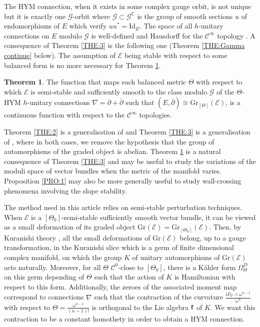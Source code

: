 \documentclass{article}
\theoremstyle{remark}
\theoremstyle{definition}
\newtheorem{theoremIntro}{Theorem}
\newcommand{\C}{\mathbb{C}}
\newcommand{\Id}{\mathrm{Id}}
\renewcommand{\i}{\boldsymbol{\mathrm{i}}}
\newcommand{\E}{\mathcal{E}}
\newcommand{\G}{\mathcal{G}}
\newcommand{\Gr}{\mathrm{Gr}}
\newcommand{\dbar}{\overline{\partial}}
\newcommand{\mC}{\mathcal{C}}
\begin{document}
The HYM connection, when it exists in some complex gauge orbit, is not unique but it is exactly one $\G$-orbit where $\G \subset \G^\C$ is the group of smooth sections $u$ of endomorphisms of $E$ which verify $uu^* = \Id_E$. The space of all $h$-unitary connections on $E$ modulo $\G$ is well-defined and Hausdorff for the $\mC^\infty$ topology \cite[Corollary 7.1.15]{Kobayashi}. A consequence of Theorem \ref{THE:3} is the following one (Theorem \ref{THE:Gamma continue} below). The assumption of $\E$ being stable with respect to some balanced form is no more necessary for Theorem \ref{THE:4}.

\begin{theoremIntro}\label{THE:4}
    The function that maps each balanced metric $\Theta$ with respect to which $\E$ is semi-stable and sufficiently smooth to the class modulo $\G$ of the $\Theta$-HYM $h$-unitary connections $\nabla = \partial + \dbar$ such that $(E,\dbar) \cong \Gr_{[\Theta]}(\E)$, is a continuous function with respect to the $\mC^\infty$ topologies.
\end{theoremIntro}

Theorem \ref{THE:2} is a generalisation of \cite[Proposition 1.1]{Clarke_Tipler} and Theorem \ref{THE:3} is a generalisation of \cite[Theorem 1.2]{Clarke_Tipler}, where in both cases, we remove the hypothesis that the group of automorphisms of the graded object is abelian. Theorem \ref{THE:4} is a natural consequence of Theorem \ref{THE:3} and may be useful to study the variations of the moduli space of vector bundles when the metric of the manifold varies. Proposition \ref{PRO:1} may also be more generally useful to study wall-crossing phenomena involving the slope stability.

The method used in this article relies on semi-stable perturbation techniques. When $\E$ is a $[\Theta_0]$-semi-stable sufficiently smooth vector bundle, it can be viewed as a small deformation of its graded object $\Gr(\E) = \Gr_{[\Theta_0]}(\E)$. Then, by Kuranishi theory \cite{Kuranishi}, all the small deformations of $\Gr(\E)$ belong, up to a gauge transformation, in the Kuranishi slice which is a germ of finite dimensional complex manifold, on which the group $K$ of unitary automorphisms of $\Gr(\E)$ acts naturally. Moreover, for all $\Theta$ $\mC^0$-close to $[\Theta_0]$, there is a Kähler form $\Omega_\Theta^D$ on this germ depending of $\Theta$ such that the action of $K$ is Hamiltonian with respect to this form. Additionally, the zeroes of the associated moment map correspond to connections $\nabla$ such that the contraction of the curvature $\frac{\i F_\nabla \wedge \omega^{n - 1}}{\omega^n}$ with respect to $\Theta = \frac{\omega^{n - 1}}{(n - 1)!}$ is orthogonal to the Lie algebra $\frak{k}$ of $K$. We want this contraction to be a constant homothety in order to obtain a HYM connection.
\end{document}

